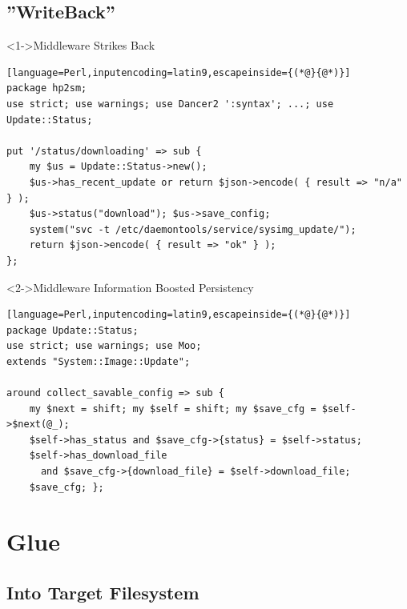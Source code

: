 \documentclass[ngerman,xcolor={table,dvipsnames},smaller,compress,hyperref={bookmarks,colorlinks},handout]{beamer}%
\begin{document}
\subsection{''WriteBack''}

\begin{frame}[t,fragile]

\begin{block}<1->{Middleware Strikes Back}
\scriptsize
\begin{lstlisting}[language=Perl,inputencoding=latin9,escapeinside={(*@}{@*)}]
package hp2sm;
use strict; use warnings; use Dancer2 ':syntax'; ...; use Update::Status;

put '/status/downloading' => sub {
    my $us = Update::Status->new();
    $us->has_recent_update or return $json->encode( { result => "n/a" } );
    $us->status("download"); $us->save_config;
    system("svc -t /etc/daemontools/service/sysimg_update/");
    return $json->encode( { result => "ok" } );
};
\end{lstlisting}
\end{block}

\begin{block}<2->{Middleware Information Boosted Persistency}
\scriptsize
\begin{lstlisting}[language=Perl,inputencoding=latin9,escapeinside={(*@}{@*)}]
package Update::Status;
use strict; use warnings; use Moo;
extends "System::Image::Update";

around collect_savable_config => sub {
    my $next = shift; my $self = shift; my $save_cfg = $self->$next(@_);
    $self->has_status and $save_cfg->{status} = $self->status;
    $self->has_download_file
      and $save_cfg->{download_file} = $self->download_file;
    $save_cfg; };
\end{lstlisting}
\end{block}

\end{frame}

\section{Glue}

\subsection{Into Target Filesystem}
\end{document}

